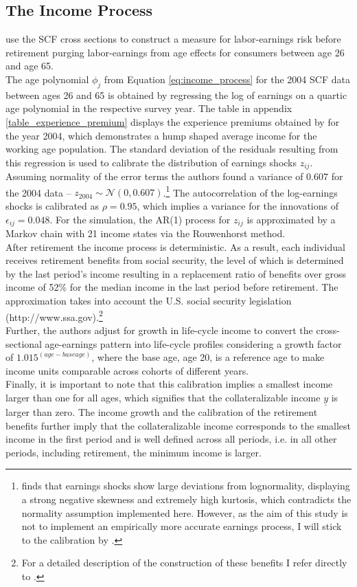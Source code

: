 \documentclass[a4paper,12pt,legno]{article}
\begin{document}
\subsection{The Income Process}
\cite{hintermaier2011} use the SCF cross sections to construct a measure for labor-earnings risk before retirement purging labor-earnings from age effects for consumers between age 26 and age 65.\\ 
The age polynomial $\phi_{j}$ from Equation \ref{eq:income_process} for the 2004 SCF data between ages 26 and 65 is obtained by regressing the log of earnings on a quartic age polynomial in the respective survey year. The table in appendix \ref{table_experience_premium} displays the experience premiums obtained by \cite{hintermaier2011} for the year 2004, which demonstrates a hump shaped average income for the working age population.
The standard deviation of the residuals resulting from this regression is used to calibrate the distribution of earnings shocks $z_{ij}$. Assuming normality of the error terms the authors found a variance of $0.607$ for the 2004 data \---  $z_{2004} \sim \mathcal{N}(0,0.607)$.\footnote{\cite{guvenen2015data} finds that earnings shocks show large deviations from lognormality, displaying a strong negative skewness and extremely high kurtosis, which contradicts the normality assumption implemented here. However, as the aim of this study is not to implement an empirically more accurate earnings process, I will stick to the calibration by \cite{hintermaier2011}.} The autocorrelation of the log-earnings shocks is calibrated as $\rho = 0.95$, which implies a variance for the innovations of $\epsilon_{ij} = 0.048$. For the simulation, the AR(1) process for $z_{ij}$ is approximated by a Markov chain with 21 income states via the Rouwenhorst method. \\
After retirement the income process is deterministic. As a result, each individual receives retirement benefits from social security, the level of which is determined by the last period's income resulting in a replacement ratio of benefits over gross income of 52\% for the median income in the last period before retirement. The approximation takes into account the U.S. social security legislation (http://www.ssa.gov).\footnote{For a detailed description of the construction of these benefits I refer directly to \cite{hintermaier2011}.} \\
Further, the authors adjust for growth in life-cycle income to convert the cross-sectional age-earnings pattern into life-cycle profiles considering a growth factor of $1.015^{(age-base age)}$, where the base age, age 20, is a reference age to make income units comparable across cohorts of different years.\\
Finally, it is important to note that this calibration implies a smallest income larger than one for all ages, which signifies that the collateralizable income $\underline{y}$ is larger than zero. The income growth and the calibration of the retirement benefits further imply that the collateralizable income corresponds to the smallest income in the first period and is well defined across all periods, i.e. in all other periods, including retirement, the minimum income is larger. 
\end{document}
